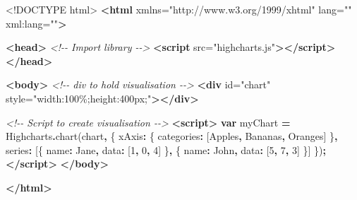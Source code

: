 \documentclass[
]{krantz}
\makeatletter
\newenvironment{Shaded}{\begin{snugshade}}{\end{snugshade}}
\newcommand{\CommentTok}[1]{\textcolor[rgb]{0.37,0.37,0.37}{\textit{#1}}}
\newcommand{\DataTypeTok}[1]{\textcolor[rgb]{0.27,0.27,0.27}{#1}}
\newcommand{\DecValTok}[1]{\textcolor[rgb]{0.06,0.06,0.06}{#1}}
\newcommand{\FunctionTok}[1]{\textcolor[rgb]{0,0,0}{#1}}
\newcommand{\KeywordTok}[1]{\textcolor[rgb]{0.27,0.27,0.27}{\textbf{#1}}}
\newcommand{\NormalTok}[1]{#1}
\newcommand{\OperatorTok}[1]{\textcolor[rgb]{0.43,0.43,0.43}{\textbf{#1}}}
\newcommand{\OtherTok}[1]{\textcolor[rgb]{0.37,0.37,0.37}{#1}}
\newcommand{\StringTok}[1]{\textcolor[rgb]{0.5,0.5,0.5}{#1}}
\newenvironment{kframe}{%
\medskip{}
\setlength{\fboxsep}{.8em}
 \def\at@end@of@kframe{}%
 \ifinner\ifhmode%
  \def\at@end@of@kframe{\end{minipage}}%
  \begin{minipage}{\columnwidth}%
 \fi\fi%
 \def\FrameCommand##1{\hskip\@totalleftmargin \hskip-\fboxsep
 \colorbox{shadecolor}{##1}\hskip-\fboxsep
     \hskip-\linewidth \hskip-\@totalleftmargin \hskip\columnwidth}%
 \MakeFramed {\advance\hsize-\width
   \@totalleftmargin\z@ \linewidth\hsize
   \@setminipage}}%
 {\par\unskip\endMakeFramed%
 \at@end@of@kframe}
\renewenvironment{Shaded}{\begin{kframe}}{\end{kframe}}
\makeatother
\begin{document}
\begin{Shaded}
\begin{Highlighting}[]
\DataTypeTok{\textless{}!DOCTYPE }\NormalTok{html}\DataTypeTok{\textgreater{}}
\KeywordTok{\textless{}html}\OtherTok{ xmlns=}\StringTok{"http://www.w3.org/1999/xhtml"}\OtherTok{ lang=}\StringTok{""}\OtherTok{ xml:lang=}\StringTok{""}\KeywordTok{\textgreater{}}

\KeywordTok{\textless{}head\textgreater{}}
  \CommentTok{\textless{}!{-}{-} Import library {-}{-}\textgreater{}}
  \KeywordTok{\textless{}script}\OtherTok{ src=}\StringTok{"highcharts.js"}\KeywordTok{\textgreater{}\textless{}/script\textgreater{}}
\KeywordTok{\textless{}/head\textgreater{}}

\KeywordTok{\textless{}body\textgreater{}}
  \CommentTok{\textless{}!{-}{-} div to hold visualisation {-}{-}\textgreater{}}
  \KeywordTok{\textless{}div}\OtherTok{ id=}\StringTok{"chart"}\OtherTok{ style=}\StringTok{"width:100\%;height:400px;"}\KeywordTok{\textgreater{}\textless{}/div\textgreater{}}

  \CommentTok{\textless{}!{-}{-} Script to create visualisation {-}{-}\textgreater{}}
  \KeywordTok{\textless{}script\textgreater{}}
    \KeywordTok{var}\NormalTok{ myChart }\OperatorTok{=}\NormalTok{ Highcharts}\OperatorTok{.}\FunctionTok{chart}\NormalTok{(}\StringTok{\textquotesingle{}chart\textquotesingle{}}\OperatorTok{,}\NormalTok{ \{}
        \DataTypeTok{xAxis}\OperatorTok{:}\NormalTok{ \{}
            \DataTypeTok{categories}\OperatorTok{:}\NormalTok{ [}\StringTok{\textquotesingle{}Apples\textquotesingle{}}\OperatorTok{,} \StringTok{\textquotesingle{}Bananas\textquotesingle{}}\OperatorTok{,} \StringTok{\textquotesingle{}Oranges\textquotesingle{}}\NormalTok{]}
\NormalTok{        \}}\OperatorTok{,}
        \DataTypeTok{series}\OperatorTok{:}\NormalTok{ [\{}
            \DataTypeTok{name}\OperatorTok{:} \StringTok{\textquotesingle{}Jane\textquotesingle{}}\OperatorTok{,}
            \DataTypeTok{data}\OperatorTok{:}\NormalTok{ [}\DecValTok{1}\OperatorTok{,} \DecValTok{0}\OperatorTok{,} \DecValTok{4}\NormalTok{]}
\NormalTok{        \}}\OperatorTok{,}\NormalTok{ \{}
            \DataTypeTok{name}\OperatorTok{:} \StringTok{\textquotesingle{}John\textquotesingle{}}\OperatorTok{,}
            \DataTypeTok{data}\OperatorTok{:}\NormalTok{ [}\DecValTok{5}\OperatorTok{,} \DecValTok{7}\OperatorTok{,} \DecValTok{3}\NormalTok{]}
\NormalTok{        \}]}
\NormalTok{    \})}\OperatorTok{;}
  \KeywordTok{\textless{}/script\textgreater{}}
\KeywordTok{\textless{}/body\textgreater{}}

\KeywordTok{\textless{}/html\textgreater{}}
\end{Highlighting}
\end{Shaded}
\end{document}
